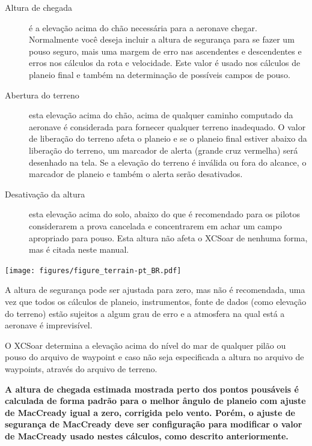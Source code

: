 \begin{description}
\item[Altura de chegada]  é a elevação acima do chão necessária para a aeronave chegar.  Normalmente você deseja incluir a altura de segurança para se fazer um pouso seguro, mais uma margem de erro nas ascendentes e descendentes e erros nos cálculos da rota e velocidade.  Este valor é usado nos cálculos de planeio final e também na determinação de possíveis campos de pouso.  
\item[Abertura do terreno]
 esta elevação acima do chão, acima de qualquer caminho computado da aeronave é considerada para fornecer qualquer terreno inadequado.  O valor de liberação do terreno afeta o planeio e se o planeio final estiver abaixo da liberação do terreno, um marcador de alerta (grande cruz vermelha) será desenhado na tela.  Se a elevação do terreno é inválida ou fora do alcance, o marcador de planeio e também o alerta serão desativados.
\item[Desativação da altura]  esta elevação acima do solo, abaixo do que é recomendado para os pilotos considerarem a prova cancelada e concentrarem em achar um campo apropriado para pouso.  Esta altura não afeta o XCSoar de nenhuma forma, mas é citada neste manual.
\end{description}

\begin{maxipage}
\begin{center}
\texttt{[image: figures/figure\_terrain-pt\_BR.pdf]}
\end{center}
\end{maxipage}

\warning
A altura de segurança pode ser ajustada para zero, mas não é recomendada, uma vez que todos os cálculos de planeio, instrumentos, fonte de dados (como elevação do terreno) estão sujeitos a algum grau de erro e a atmosfera na qual está a aeronave é imprevisível.

 O XCSoar determina a elevação acima do nível do mar de qualquer pilão ou pouso do arquivo de waypoint e caso não seja especificada a altura no arquivo de waypoints, através do arquivo de terreno.

\textbf{A altura de chegada estimada mostrada perto dos pontos pousáveis é calculada de forma padrão para o melhor ângulo de planeio com ajuste de MacCready igual a zero, corrigida pelo vento.  Porém, o ajuste de segurança de MacCready deve ser configuração para modificar o valor de MacCready usado nestes cálculos, como descrito anteriormente.}

